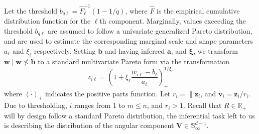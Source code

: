 Let the threshold $b_{q\ell} = \hat{F}_{\ell}^{-1}(1 - 1/q)$, where $\hat{F}$ is
    the empirical cumulative distribution function for the $\ell$th component.
    Marginally, values exceeding the threshold $b_{q\ell}$ are assumed to follow
    a univariate generalized Pareto distribution, and are used to estimate the
    corresponding marginal scale and shape parameters $a_{\ell}$ and $\xi_{\ell}$
    respectively.  Setting $\bm{b}$ and having inferred $\bm{a}$, and $\bm{\xi}$, 
    we transform $\bm{w}\mid \bm{w}\not\leq \bm{b}$ to a standard multivariate 
    Pareto form via the transformation
    \begin{equation}
        z_{i\ell} = \left(1 + \xi_{\ell}\frac{w_{i\ell} 
            - b_{\ell}}{a_{\ell}}\right)_{+}^{1 / \xi_{\ell}}
    \end{equation}
    where $(\cdot)_+$ indicates the positive parts function.  Let 
    $r_i = \lVert \bm{z}_i$, and $\bm{v}_i = \bm{z}_i / r_i$.  Due to 
    thresholding, $i$ ranges from 1 to $m\leq n$, and $r_i > 1$.  Recall that
    $R\in\mathbb{R}_+$ will by design follow a standard Pareto distribution,
    the inferential task left to us is describing the distribution of the
    angular component $\bm{V}\in\mathbb{S}_{\infty}^{d-1}$.  

